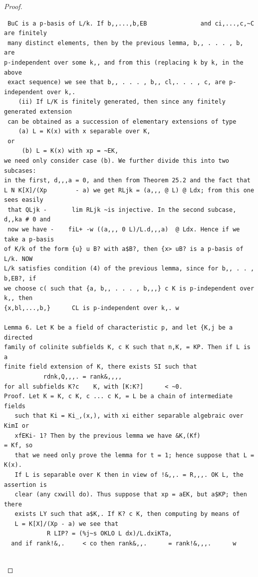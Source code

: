 \begin{proof}
\begin{verbatim}
 BuC is a p-basis of L/k. If b,,...,b,EB               and ci,...,c,~C     are finitely
 many distinct elements, then by the previous lemma, b,, . . . , b, are
p-independent over some k,, and from this (replacing k by k, in the above
 exact sequence) we see that b,, . . . , b,, cl,. . . , c, are p-independent over k,.
    (ii) If L/K is finitely generated, then since any finitely generated extension
 can be obtained as a succession of elementary extensions of type
    (a) L = K(x) with x separable over K,
 or
     (b) L = K(x) with xp = ~EK,
we need only consider case (b). We further divide this into two subcases:
in the first, d,,,a = 0, and then from Theorem 25.2 and the fact that
L N K[X]/(Xp        - a) we get RLjk = (a,,, @ L) @ Ldx; from this one sees easily
 that QLjk -       lim RLjk ~is injective. In the second subcase, d,,ka # 0 and
 now we have -    fiL+ -w ((a,,, 0 L)/L.d,,,a)  @ Ldx. Hence if we take a p-basis
of K/k of the form {u} u B? with a$B?, then {x> uB? is a p-basis of L/k. NOW
L/k satisfies condition (4) of the previous lemma, since for b,, . . , b,EB?, if
we choose c( such that {a, b,, . . . , b,,,} c K is p-independent over k,, then
{x,bl,...,b,}      CL is p-independent over k,. w

Lemma 6. Let K be a field of characteristic p, and let {K,j be a directed
family of colinite subfields K, c K such that n,K, = KP. Then if L is a
finite field extension of K, there exists SI such that
           rdnk,Q,,,. = rank&,,,,
for all subfields K?c    K, with [K:K?]      < ~0.
Proof. Let K = K, c K, c ... c K, = L be a chain of intermediate fields
   such that Ki = Ki_,(x,), with xi either separable algebraic over KimI or
   xfEKi- 1? Then by the previous lemma we have &K,(Kf)               = Kf, so
   that we need only prove the lemma for t = 1; hence suppose that L = K(x).
   If L is separable over K then in view of !&,,. = R,,,. OK L, the assertion is
   clear (any cxwill do). Thus suppose that xp = aEK, but a$KP; then there
   exists LY such that a$K,. If K? c K, then computing by means of
   L = K[X]/(Xp - a) we see that
            R LIP? = (%j~s OKLO L dx)/L.dxiKTa,
  and if rank!&,.     < co then rank&,,.      = rank!&,,,.      w


\end{verbatim}
\end{proof}
